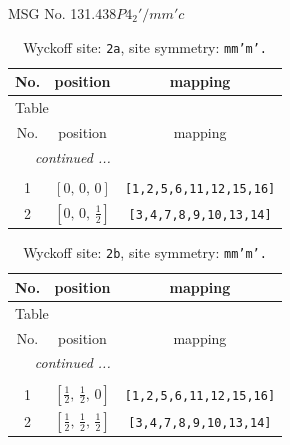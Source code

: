 \documentclass[fleqn,8pt]{jsarticle}
\begin{document}
\setcounter{MaxMatrixCols}{32}

\renewcommand{\tablename}{Table~}
\renewcommand{\figurename}{Figure~}
\begin{center}
\LARGE
MSG No. 131.438\quad$P4_{2}'/mm'c$
\end{center}
\renewcommand{\arraystretch}{1.2}
\begin{longtable}{ccc}
\caption{Wyckoff site: {\tt 2a}, site symmetry: {\tt mm'm'.}}
 \\
 \hline \hline
No. & position & mapping \\ \hline \endfirsthead

\multicolumn{2}{l}{\tablename\ \thetable{}} \\
 \hline \hline
No. & position & mapping \\ \hline \endhead

 \hline \hline
\multicolumn{2}{r}{\footnotesize\it continued ...} \\ \endfoot

 \hline \hline
\multicolumn{2}{r}{} \\ \endlastfoot

1 & $\left[ 0,\, 0,\, 0 \right]$ & {\tt [1,2,5,6,11,12,15,16]} \\ \hline
2 & $\left[ 0,\, 0,\, \frac{1}{2} \right]$ & {\tt [3,4,7,8,9,10,13,14]} \\
\end{longtable}
\renewcommand{\arraystretch}{1.2}
\begin{longtable}{ccc}
\caption{Wyckoff site: {\tt 2b}, site symmetry: {\tt mm'm'.}}
 \\
 \hline \hline
No. & position & mapping \\ \hline \endfirsthead

\multicolumn{2}{l}{\tablename\ \thetable{}} \\
 \hline \hline
No. & position & mapping \\ \hline \endhead

 \hline \hline
\multicolumn{2}{r}{\footnotesize\it continued ...} \\ \endfoot

 \hline \hline
\multicolumn{2}{r}{} \\ \endlastfoot

1 & $\left[ \frac{1}{2},\, \frac{1}{2},\, 0 \right]$ & {\tt [1,2,5,6,11,12,15,16]} \\ \hline
2 & $\left[ \frac{1}{2},\, \frac{1}{2},\, \frac{1}{2} \right]$ & {\tt [3,4,7,8,9,10,13,14]} \\
\end{longtable}
\end{document}
